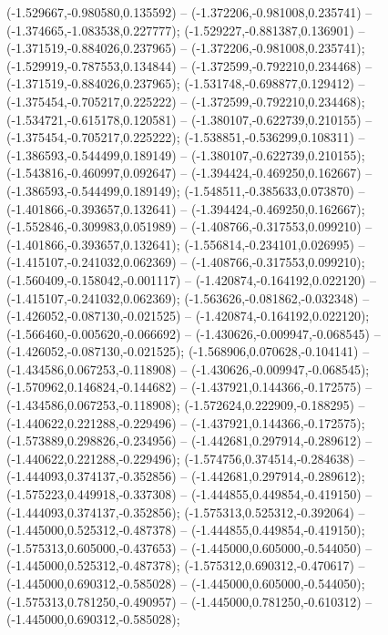  (-1.529667,-0.980580,0.135592) -- (-1.372206,-0.981008,0.235741) -- (-1.374665,-1.083538,0.227777);
 (-1.529227,-0.881387,0.136901) -- (-1.371519,-0.884026,0.237965) -- (-1.372206,-0.981008,0.235741);
 (-1.529919,-0.787553,0.134844) -- (-1.372599,-0.792210,0.234468) -- (-1.371519,-0.884026,0.237965);
 (-1.531748,-0.698877,0.129412) -- (-1.375454,-0.705217,0.225222) -- (-1.372599,-0.792210,0.234468);
 (-1.534721,-0.615178,0.120581) -- (-1.380107,-0.622739,0.210155) -- (-1.375454,-0.705217,0.225222);
 (-1.538851,-0.536299,0.108311) -- (-1.386593,-0.544499,0.189149) -- (-1.380107,-0.622739,0.210155);
 (-1.543816,-0.460997,0.092647) -- (-1.394424,-0.469250,0.162667) -- (-1.386593,-0.544499,0.189149);
 (-1.548511,-0.385633,0.073870) -- (-1.401866,-0.393657,0.132641) -- (-1.394424,-0.469250,0.162667);
 (-1.552846,-0.309983,0.051989) -- (-1.408766,-0.317553,0.099210) -- (-1.401866,-0.393657,0.132641);
 (-1.556814,-0.234101,0.026995) -- (-1.415107,-0.241032,0.062369) -- (-1.408766,-0.317553,0.099210);
 (-1.560409,-0.158042,-0.001117) -- (-1.420874,-0.164192,0.022120) -- (-1.415107,-0.241032,0.062369);
 (-1.563626,-0.081862,-0.032348) -- (-1.426052,-0.087130,-0.021525) -- (-1.420874,-0.164192,0.022120);
 (-1.566460,-0.005620,-0.066692) -- (-1.430626,-0.009947,-0.068545) -- (-1.426052,-0.087130,-0.021525);
 (-1.568906,0.070628,-0.104141) -- (-1.434586,0.067253,-0.118908) -- (-1.430626,-0.009947,-0.068545);
 (-1.570962,0.146824,-0.144682) -- (-1.437921,0.144366,-0.172575) -- (-1.434586,0.067253,-0.118908);
 (-1.572624,0.222909,-0.188295) -- (-1.440622,0.221288,-0.229496) -- (-1.437921,0.144366,-0.172575);
 (-1.573889,0.298826,-0.234956) -- (-1.442681,0.297914,-0.289612) -- (-1.440622,0.221288,-0.229496);
 (-1.574756,0.374514,-0.284638) -- (-1.444093,0.374137,-0.352856) -- (-1.442681,0.297914,-0.289612);
 (-1.575223,0.449918,-0.337308) -- (-1.444855,0.449854,-0.419150) -- (-1.444093,0.374137,-0.352856);
 (-1.575313,0.525312,-0.392064) -- (-1.445000,0.525312,-0.487378) -- (-1.444855,0.449854,-0.419150);
 (-1.575313,0.605000,-0.437653) -- (-1.445000,0.605000,-0.544050) -- (-1.445000,0.525312,-0.487378);
 (-1.575312,0.690312,-0.470617) -- (-1.445000,0.690312,-0.585028) -- (-1.445000,0.605000,-0.544050);
 (-1.575313,0.781250,-0.490957) -- (-1.445000,0.781250,-0.610312) -- (-1.445000,0.690312,-0.585028);

